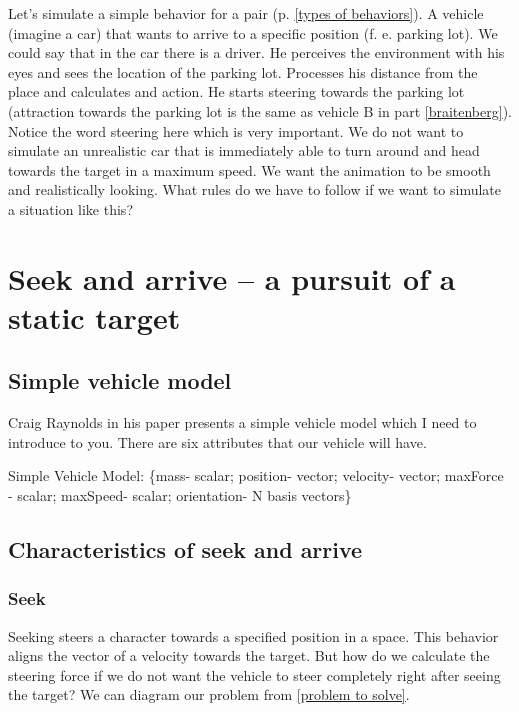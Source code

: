 \documentclass[10pt,twoside,english,a4paper]{article}
\begin{document}
Let’s simulate a simple behavior for a pair (p. \ref{types of behaviors}). A vehicle (imagine a car) that wants to arrive to a specific position (f. e. parking lot). We could say that in the car there is a driver. He perceives the environment with his eyes and sees the location of the parking lot. Processes his distance from the place and calculates and action. He starts steering towards the parking lot (attraction towards the parking lot is the same as vehicle B in part \ref{braitenberg}). Notice the word steering here which is very important. We do not want to simulate an unrealistic car that is immediately able to turn around and head towards the target in a maximum speed. We want the animation to be smooth and realistically looking. What rules do we have to follow if we want to simulate a situation like this?


\section{Seek and arrive – a pursuit of a static target} \label{seek and arrive}

\subsection{Simple vehicle model} \label{model}
Craig Raynolds in his paper \cite{Raynolds} presents a simple vehicle model which I need to introduce to you. There are six attributes that our vehicle will have. 

Simple Vehicle Model: \{mass- scalar; position- vector; velocity-	vector; maxForce - scalar; maxSpeed- scalar; orientation- N basis vectors\}

\subsection{Characteristics of seek and arrive } \label{characterictics of seek and arrive}

\subsubsection{Seek} \label{seek}

Seeking steers a character towards a specified position in a space. This behavior aligns the vector of a velocity towards the target. But how do we calculate the steering force if we do not want the vehicle to steer completely right after seeing the target? We can diagram our problem from \ref{problem to solve}.
\end{document}
